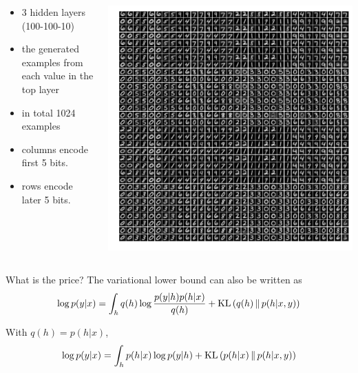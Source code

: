 \documentclass[14pt,aspectratio=1610]{beamer}
\begin{document}
\begin{frame}
\begin{columns}

\begin{column}[t]{0.3\linewidth}
\footnotesize
\vspace{1cm}
\begin{itemize}
\item 3 hidden layers (100-100-10)
\item the generated examples from each value in the top layer
\item in total 1024 examples
\item columns encode first 5 bits.
\item rows encode later 5 bits.
\end{itemize}
\end{column}
\hfill
\begin{column}[t]{0.68\linewidth}
\begin{center}
\includegraphics[width=0.95\textheight]{varsbn_mnist.pdf} 
\end{center}
\end{column}
\end{columns}
\end{frame}

\begin{frame}{What is the price?}
The variational lower bound can also be written as
\begin{align*}
\log p(y | x) = \int_{h} q(h) \log \frac{p(y| h) p(h |x)}{q(h)} + \text{KL}\left( q(h)\,\|\,p(h|x, y) \right)
\end{align*}

With $q(h) = p(h|x)$,
\begin{align*}
\log p(y | x) = \int_{h} p(h|x) \log p(y| h) + \text{KL}\left( p(h|x)\,\|\,p(h|x, y) \right)
\end{align*}
\end{frame}
\end{document}
